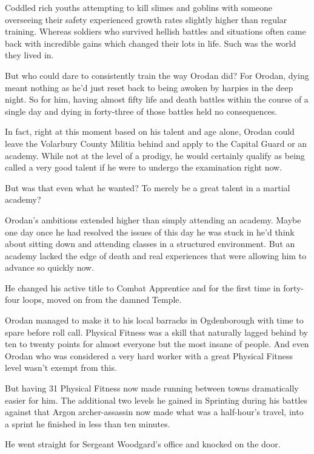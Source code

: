 \documentclass[a4paper,10pt]{book}
\begin{document}
Coddled rich youths attempting to kill slimes and goblins with someone overseeing their safety experienced growth rates slightly higher than regular training. Whereas soldiers who survived hellish battles and situations often came back with incredible gains which changed their lots in life. Such was the world they lived in.\par
But who could dare to consistently train the way Orodan did? For Orodan, dying meant nothing as he’d just reset back to being awoken by harpies in the deep night. So for him, having almost fifty life and death battles within the course of a single day and dying in forty-three of those battles held no consequences.\par
In fact, right at this moment based on his talent and age alone, Orodan could leave the Volarbury County Militia behind and apply to the Capital Guard or an academy. While not at the level of a prodigy, he would certainly qualify as being called a very good talent if he were to undergo the examination right now.\par
But was that even what he wanted? To merely be a great talent in a martial academy?\par
Orodan’s ambitions extended higher than simply attending an academy. Maybe one day once he had resolved the issues of this day he was stuck in he’d think about sitting down and attending classes in a structured environment. But an academy lacked the edge of death and real experiences that were allowing him to advance so quickly now.\par
He changed his active title to Combat Apprentice and for the first time in forty-four loops, moved on from the damned Temple.\par
\par
Orodan managed to make it to his local barracks in Ogdenborough with time to spare before roll call. Physical Fitness was a skill that naturally lagged behind by ten to twenty points for almost everyone but the most insane of people. And even Orodan who was considered a very hard worker with a great Physical Fitness level wasn’t exempt from this.\par
But having 31 Physical Fitness now made running between towns dramatically easier for him. The additional two levels he gained in Sprinting during his battles against that Argon archer-assassin now made what was a half-hour’s travel, into a sprint he finished in less than ten minutes.\par
He went straight for Sergeant Woodgard’s office and knocked on the door.\par
\end{document}
